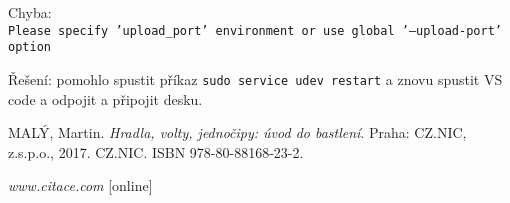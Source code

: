  Chyba: \\
 {\tt  Please specify 'upload\_port' environment or use global '--upload-port' option}
 
 Řešení: pomohlo spustit příkaz {\tt sudo service udev restart} a znovu spustit VS code a odpojit a připojit desku.  


\begin{thebibliography}{9} \label{literatura}
	
	 MALÝ, Martin. \textit{Hradla, volty, jednočipy: úvod do bastlení}. Praha: CZ.NIC, z.s.p.o., 2017. CZ.NIC. ISBN 978-80-88168-23-2.
	
	 \textit{www.citace.com}  [online]
	
\end{thebibliography}



